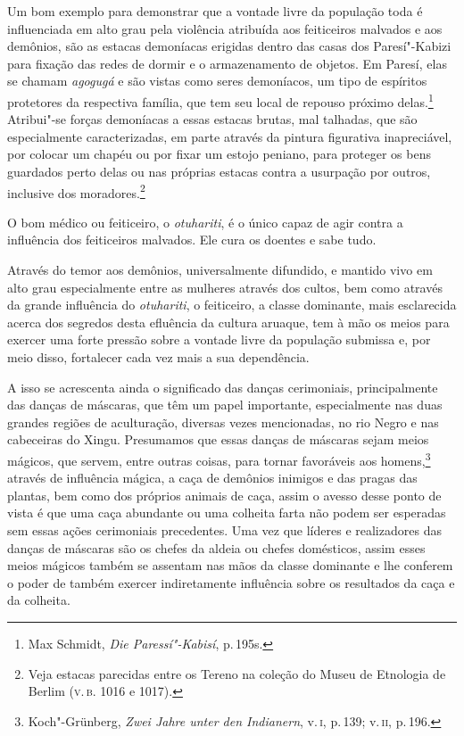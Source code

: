 Um bom exemplo para demonstrar que a vontade livre da população toda é
influenciada em alto grau pela violência atribuída aos feiticeiros
malvados e aos demônios, são as estacas demoníacas erigidas dentro das
casas dos Paresí"-Kabizi para fixação das redes de dormir e o
armazenamento de objetos. Em Paresí, elas se chamam \textit{agogugá} e são
vistas como seres demoníacos, um tipo de espíritos protetores da
respectiva família, que tem seu local de repouso próximo delas.\footnote{Max
  Schmidt, \textit{Die Paressí"-Kabisí}, p.\,195s.} Atribui"-se forças
demoníacas a essas estacas brutas, mal talhadas, que são especialmente
caracterizadas, em parte através da pintura figurativa inapreciável, por
colocar um chapéu ou por fixar um estojo peniano, para proteger os bens
guardados perto delas ou nas próprias estacas contra a usurpação por
outros, inclusive dos moradores.\footnote{Veja estacas parecidas entre os
  Tereno na coleção do Museu de Etnologia de Berlim (\textsc{v.\,b.} 1016 e 1017).}

{O bom médico ou feiticeiro, o \textit{otuhariti}, é o único capaz de agir
contra a influência dos feiticeiros malvados. Ele cura os doentes e sabe
tudo.}

Através do temor aos demônios, universalmente difundido, e mantido vivo
em alto grau especialmente entre as mulheres através dos cultos, bem
como através da grande influência do \textit{otuhariti}, o feiticeiro, a
classe dominante, mais esclarecida acerca dos segredos desta efluência
da cultura aruaque, tem à mão os meios para exercer uma forte pressão
sobre a vontade livre da população submissa e, por meio disso,
fortalecer cada vez mais a sua dependência.

A isso se acrescenta ainda o significado das danças cerimoniais,
principalmente das danças de máscaras, que têm um papel importante,
especialmente nas duas grandes regiões de aculturação, diversas vezes
mencionadas, no rio Negro e nas cabeceiras do Xingu. Presumamos que
essas danças de máscaras sejam meios mágicos, que servem, entre outras
coisas, para tornar favoráveis aos homens,\footnote{Koch"-Grünberg,
  \textit{Zwei Jahre unter den Indianern}, v.\,\textsc{i}, p.\,139; v.\,\textsc{ii}, p.\,196.}
através de influência mágica, a caça de demônios inimigos e das pragas
das plantas, bem como dos próprios animais de caça, assim o avesso desse
ponto de vista é que uma caça abundante ou uma colheita farta não podem
ser esperadas sem essas ações cerimoniais precedentes. Uma vez que
líderes e realizadores das danças de máscaras são os chefes da aldeia ou
chefes domésticos, assim esses meios mágicos também se assentam nas
mãos da classe dominante e lhe conferem o poder de também exercer
indiretamente influência sobre os resultados da caça e da colheita.

